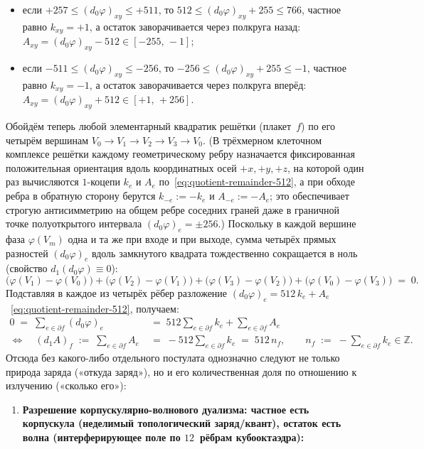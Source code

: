 \begin{corollary}[Единство природы и количества заряда: частное и остаток одного деления на $\phaseRingCount = 512$]
\begin{itemize}[nosep,leftmargin=*]
\item если $+257 \le (d_0\varphi)_{xy} \le +511$, то $512 \le (d_0\varphi)_{xy} + 255 \le 766$, частное равно $k_{xy} = +1$, а остаток заворачивается через полкруга назад: $A_{xy} = (d_0\varphi)_{xy} - 512 \in [-255,\,-1]$;
\item если $-511 \le (d_0\varphi)_{xy} \le -256$, то $-256 \le (d_0\varphi)_{xy} + 255 \le -1$, частное равно $k_{xy} = -1$, а остаток заворачивается через полкруга вперёд: $A_{xy} = (d_0\varphi)_{xy} + 512 \in [+1,\,+256]$.
\end{itemize}
Обойдём теперь любой элементарный квадратик решётки (плакет~$f$) по его четырём вершинам $V_0\to V_1\to V_2\to V_3\to V_0$.
(В трёхмерном клеточном комплексе решётки каждому геометрическому ребру назначается фиксированная положительная ориентация вдоль координатных осей $+x,+y,+z$, на которой один раз вычисляются $1$-коцепи $k_e$ и $A_e$ по~\eqref{eq:quotient-remainder-512}, а при обходе ребра в обратную сторону берутся $k_{-e} := -k_e$ и $A_{-e} := -A_e$; это обеспечивает строгую антисимметрию на общем ребре соседних граней даже в граничной точке полуоткрытого интервала $(d_0\varphi)_e = \pm 256$.)
Поскольку в каждой вершине фаза $\varphi(V_m)$ одна и та же при входе и при выходе, сумма четырёх прямых разностей $(d_0\varphi)_e$ вдоль замкнутого квадрата тождественно сокращается в ноль (свойство $d_1(d_0\varphi)\equiv 0$):
\[
  \bigl(\varphi(V_1)-\varphi(V_0)\bigr)
  + \bigl(\varphi(V_2)-\varphi(V_1)\bigr)
  + \bigl(\varphi(V_3)-\varphi(V_2)\bigr)
  + \bigl(\varphi(V_0)-\varphi(V_3)\bigr)
  \;=\; 0.
\]
Подставляя в каждое из четырёх рёбер разложение $(d_0\varphi)_e = 512\,k_e + A_e$~\eqref{eq:quotient-remainder-512}, получаем:
\[
\begin{aligned}
  0 \;=\; \sum_{e\in\partial f} (d_0\varphi)_e
  &\;=\; 512\sum_{e\in\partial f} k_e + \sum_{e\in\partial f} A_e\\
  \Longleftrightarrow\quad
  (d_1 A)_f \;:=\; \sum_{e\in\partial f} A_e
  &\;=\; -512\sum_{e\in\partial f} k_e \;=\; 512\,n_f,
  \qquad
  n_f \;:=\; -\sum_{e\in\partial f} k_e \in \mathbb{Z}.
\end{aligned}
\]
Отсюда без какого-либо отдельного постулата однозначно следуют не только природа заряда («откуда заряд»),
но и его количественная доля по отношению к излучению («сколько его»):
\begin{enumerate}[label=(\roman*)]
\item \textbf{Разрешение корпускулярно-волнового дуализма: частное есть корпускула (неделимый топологический заряд/квант), остаток есть волна (интерферирующее поле по $12$~рёбрам кубооктаэдра):}

\end{enumerate}
\end{corollary}
